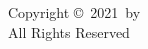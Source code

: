 \begin{titlepage}

\end{titlepage}

\thispagestyle{empty}%
\vspace*{\fill}
\begin{center}
Copyright \copyright ~2021~by \myname\\
All Rights Reserved
\end{center}
\vspace*{\fill}
\clearpage


{} \setcounter{page}{3}



